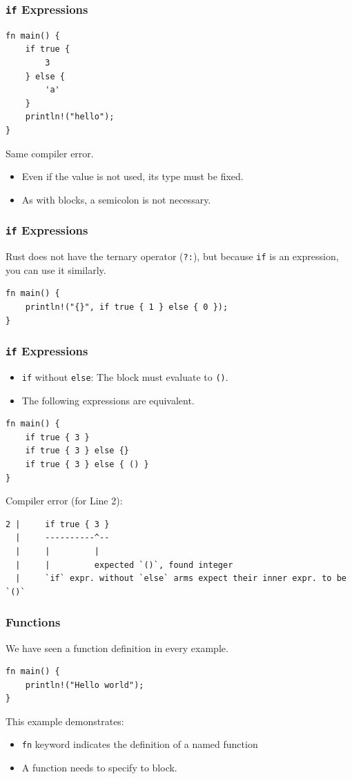 \documentclass[aspectratio=169]{beamer}
\begin{document}
\begin{frame}[fragile]
    \frametitle{\texttt{if} Expressions}
    \begin{verbatim}
fn main() {
    if true {
        3
    } else {
        'a'
    }
    println!("hello");
}
    \end{verbatim}
    \pause
    Same compiler error.
    \pause
    \begin{itemize}
        \item Even if the value is not used, its type must be fixed.
        \pause
        \item As with blocks, a semicolon is not necessary.
    \end{itemize}
\end{frame}

\begin{frame}[fragile]
    \frametitle{\texttt{if} Expressions}
    Rust does not have the ternary operator (\texttt{?:}), but because \texttt{if} is an expression, you can use it similarly.
    \pause
    \begin{verbatim}
fn main() {
    println!("{}", if true { 1 } else { 0 });
}
    \end{verbatim}
\end{frame}

\begin{frame}[fragile]
    \frametitle{\texttt{if} Expressions}
    \begin{itemize}
        \item \texttt{if} without \texttt{else}: The block must evaluate to \texttt{()}.
        \pause
        \item The following expressions are equivalent.
    \end{itemize}
    \begin{verbatim}
fn main() {
    if true { 3 }
    if true { 3 } else {}
    if true { 3 } else { () }
}
    \end{verbatim}
    \pause
    Compiler error (for Line 2):
    \begin{verbatim}
2 |     if true { 3 }
  |     ----------^--
  |     |         |
  |     |         expected `()`, found integer
  |     `if` expr. without `else` arms expect their inner expr. to be `()`
    \end{verbatim}
\end{frame}

\begin{frame}[fragile]
    \frametitle{Functions}
    We have seen a function definition in every example.
    \pause
    \begin{verbatim}
fn main() {
    println!("Hello world");
}
    \end{verbatim}
    \pause
    This example demonstrates:
    \begin{itemize}
        \item \texttt{fn} keyword indicates the definition of a named function
        \item A function needs to specify to block.
    \end{itemize}
\end{frame}
\end{document}
